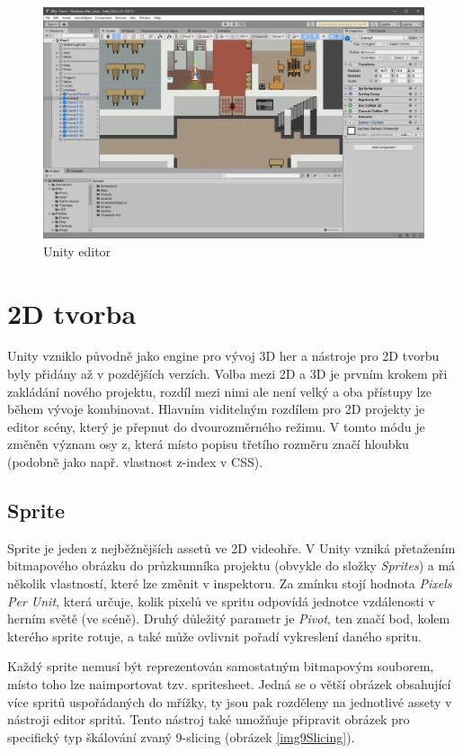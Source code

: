 \documentclass[FM,Proj]{tulthesis}
\begin{document}
	\begin{figure}[ht]
		\centering
		\includegraphics[width=\textwidth]{img/UnityEditor}
		\caption{Unity editor}
	\end{figure}
	
	\section{2D tvorba}
	
	Unity vzniklo původně jako engine pro vývoj 3D her a nástroje pro 2D tvorbu byly přidány až v pozdějších verzích. Volba mezi 2D a 3D je prvním krokem při zakládání nového projektu, rozdíl mezi nimi ale není velký a oba přístupy lze během vývoje kombinovat. Hlavním viditelným rozdílem pro 2D projekty je editor scény, který je přepnut do dvourozměrného režimu. V tomto módu je změněn význam osy z, která místo popisu třetího rozměru značí hloubku (podobně jako např. vlastnost z-index v CSS). \cite{Unity2DAnnouncement}
	
	\subsection{Sprite} %
	
	Sprite je jeden z nejběžnějších assetů ve 2D videohře. V Unity vzniká přetažením bitmapového obrázku do průzkumníka projektu (obvykle do složky \textit{Sprites}) a má několik vlastností, které lze změnit v inspektoru. Za zmínku stojí hodnota \textit{Pixels Per Unit}, která určuje, kolik pixelů ve spritu odpovídá jednotce vzdálenosti v herním světě (ve scéně). Druhý důležitý parametr je \textit{Pivot}, ten značí bod, kolem kterého sprite rotuje, a také může ovlivnit pořadí vykreslení daného spritu.
	
	Každý sprite nemusí být reprezentován samostatným bitmapovým souborem, místo toho lze naimportovat tzv. spritesheet. Jedná se o větší obrázek obsahující více spritů uspořádaných do mřížky, ty jsou pak rozděleny na jednotlivé assety v nástroji editor spritů. Tento nástroj také umožňuje připravit obrázek pro specifický typ škálování zvaný 9-slicing (obrázek \ref{img9Slicing}).
	
\end{document}
